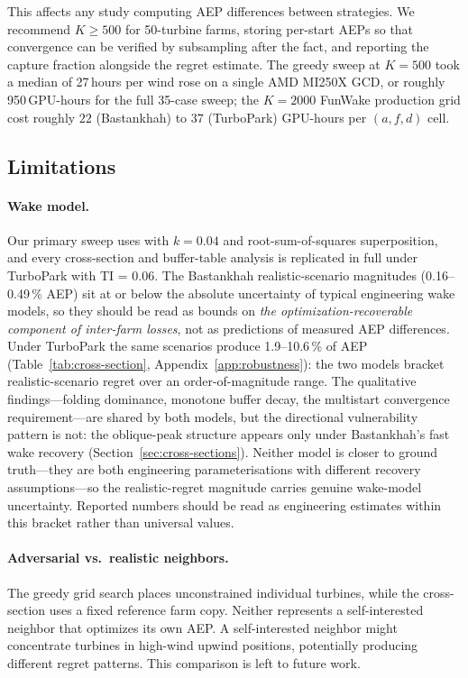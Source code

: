 \documentclass[wes, manuscript]{copernicus}
\begin{document}
This affects any study computing AEP differences between strategies.
We recommend $K \geq 500$ for 50-turbine farms, storing per-start AEPs so that convergence can be verified by subsampling after the fact, and reporting the capture fraction alongside the regret estimate.
The greedy sweep at $K = 500$ took a median of 27\,hours per wind rose on a single AMD MI250X GCD, or roughly 950\,GPU-hours for the full 35-case sweep; the $K = 2000$ FunWake production grid cost roughly $22$ (Bastankhah) to $37$ (TurboPark) GPU-hours per $(a, f, d)$ cell.

\subsection{Limitations}\label{sec:limitations}

\paragraph{Wake model.}
Our primary sweep uses \citet{Bastankhah2014} with $k = 0.04$ and root-sum-of-squares superposition, and every cross-section and buffer-table analysis is replicated in full under TurboPark \citep{Nygaard2022} with TI = 0.06.
The Bastankhah realistic-scenario magnitudes (0.16--0.49\,\% AEP) sit at or below the absolute uncertainty of typical engineering wake models, so they should be read as bounds on \emph{the optimization-recoverable component of inter-farm losses}, not as predictions of measured AEP differences.
Under TurboPark the same scenarios produce 1.9--10.6\,\% of AEP (Table~\ref{tab:cross-section}, Appendix~\ref{app:robustness}): the two models bracket realistic-scenario regret over an order-of-magnitude range.
The qualitative findings---folding dominance, monotone buffer decay, the multistart convergence requirement---are shared by both models, but the directional vulnerability pattern is not: the oblique-peak structure appears only under Bastankhah's fast wake recovery (Section~\ref{sec:cross-sections}).
Neither model is closer to ground truth---they are both engineering parameterisations with different recovery assumptions---so the realistic-regret magnitude carries genuine wake-model uncertainty.
Reported numbers should be read as engineering estimates within this bracket rather than universal values.

\paragraph{Adversarial vs.\ realistic neighbors.}
The greedy grid search places unconstrained individual turbines, while the cross-section uses a fixed reference farm copy.
Neither represents a self-interested neighbor that optimizes its own AEP.
A self-interested neighbor might concentrate turbines in high-wind upwind positions, potentially producing different regret patterns.
This comparison is left to future work.
\end{document}
